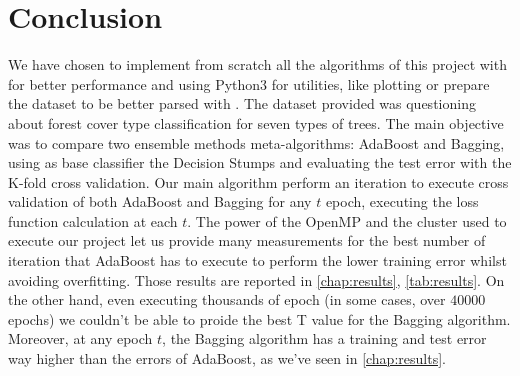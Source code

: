 \chapter{Conclusion}
We have chosen to implement from scratch all the algorithms of this project with  for better performance and using Python3 for utilities, like plotting or prepare the dataset to be better parsed with \CC. The dataset provided was questioning about forest cover type classification for seven types of trees. The main objective was to compare two ensemble methods meta-algorithms: AdaBoost and Bagging, using as base classifier the Decision Stumps and evaluating the test error with the K-fold cross validation. Our main algorithm perform an iteration to execute cross validation of both AdaBoost and Bagging for any $t$ epoch, executing the loss function calculation at each $t$. The power of the OpenMP and the cluster used to execute our project let us provide many measurements for the best number of iteration that AdaBoost has to execute to perform the lower training error whilst avoiding overfitting. Those results are reported in \autoref{chap:results}, \autoref{tab:results}. On the other hand, even executing thousands of epoch (in some cases, over $40000$ epochs) we couldn't be able to proide the best T value for the Bagging algorithm. Moreover, at any epoch $t$, the Bagging algorithm has a training and test error way higher than the errors of AdaBoost, as we've seen in \autoref{chap:results}.